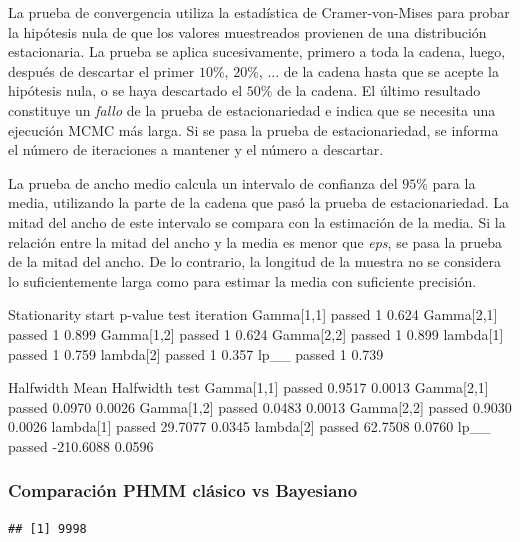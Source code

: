 \documentclass[a4paper]{article}\usepackage[]{graphicx}\usepackage[]{color}
\makeatletter
\newenvironment{kframe}{%
 \def\at@end@of@kframe{}%
 \ifinner\ifhmode%
  \def\at@end@of@kframe{\end{minipage}}%
  \begin{minipage}{\columnwidth}%
 \fi\fi%
 \def\FrameCommand##1{\hskip\@totalleftmargin \hskip-\fboxsep
 \colorbox{shadecolor}{##1}\hskip-\fboxsep
     \hskip-\linewidth \hskip-\@totalleftmargin \hskip\columnwidth}%
 \MakeFramed {\advance\hsize-\width
   \@totalleftmargin\z@ \linewidth\hsize
   \@setminipage}}%
 {\par\unskip\endMakeFramed%
 \at@end@of@kframe}
\newenvironment{knitrout}{}{} %
\makeatother
\begin{document}
La prueba de convergencia utiliza la estadística de Cramer-von-Mises para probar la hipótesis nula de que los valores muestreados provienen de una distribución estacionaria. La prueba se aplica sucesivamente, primero a toda la cadena, luego, después de descartar el primer $10 \%$, $20 \%$, ... de la cadena hasta que se acepte la hipótesis nula, o se haya descartado el $50 \%$ de la cadena. El último resultado constituye un \emph{fallo} de la prueba de estacionariedad e indica que se necesita una ejecución MCMC más larga. Si se pasa la prueba de estacionariedad, se informa el número de iteraciones a mantener y el número a descartar.

La prueba de ancho medio calcula un intervalo de confianza del $95 \%$ para la media, utilizando la parte de la cadena que pasó la prueba de estacionariedad. La mitad del ancho de este intervalo se compara con la estimación de la media. Si la relación entre la mitad del ancho y la media es menor que \emph{eps}, se pasa la prueba de la mitad del ancho. De lo contrario, la longitud de la muestra no se considera lo suficientemente larga como para estimar la media con suficiente precisión.

                                         
           Stationarity start     p-value
           test         iteration        
Gamma[1,1] passed       1         0.624  
Gamma[2,1] passed       1         0.899  
Gamma[1,2] passed       1         0.624  
Gamma[2,2] passed       1         0.899  
lambda[1]  passed       1         0.759  
lambda[2]  passed       1         0.357  
lp__       passed       1         0.739  
                                        
           Halfwidth Mean      Halfwidth
           test                         
Gamma[1,1] passed       0.9517 0.0013   
Gamma[2,1] passed       0.0970 0.0026   
Gamma[1,2] passed       0.0483 0.0013   
Gamma[2,2] passed       0.9030 0.0026   
lambda[1]  passed      29.7077 0.0345   
lambda[2]  passed      62.7508 0.0760   
lp__       passed    -210.6088 0.0596   


\subsubsection{Comparación PHMM clásico vs Bayesiano}

\begin{knitrout}
\color{fgcolor}\begin{kframe}
\begin{verbatim}
## [1] 9998
\end{verbatim}
\end{kframe}
\end{knitrout}
\end{document}

